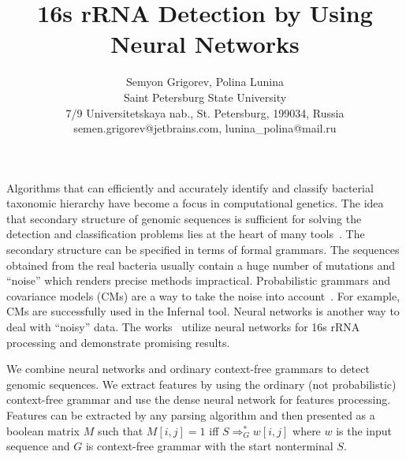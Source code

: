\documentclass[12pt]{article}  %
\title{16s rRNA Detection by Using Neural Networks}
\author{Semyon Grigorev, Polina Lunina
\\
       {Saint Petersburg State University}\\
       {7/9 Universitetskaya nab., St. Petersburg, 199034, Russia}\\
       semen.grigorev@jetbrains.com, lunina\_polina@mail.ru
       }
\date{}
\theoremstyle{definition}
\theoremstyle{remark}
\begin{document}
\maketitle
Algorithms that can efficiently and accurately identify and classify bacterial taxonomic hierarchy have become a focus in computational genetics.
The idea that secondary structure of genomic sequences is sufficient for solving the detection and classification problems lies at the heart of many tools~\cite{GrammarsRNA, PCFG, meta, LWPCFG}. 
The secondary structure can be specified in terms of formal grammars. 
The sequences obtained from the real bacteria usually contain a huge number of mutations and ``noise'' which renders precise methods impractical. 
Probabilistic grammars and covariance models (CMs) are a way to take the noise into account~\cite{EddyDurbin}.
For example, CMs are successfully used in the Infernal tool.%
Neural networks is another way to deal with ``noisy'' data. 
The works~\cite{Humidor, ANN} utilize neural networks for 16s rRNA processing and demonstrate promising results. 
%


We combine neural networks and ordinary context-free grammars to detect genomic sequences. 
We extract features by using the ordinary (not probabilistic) context-free grammar and use the dense neural network for features processing.
Features can be extracted by any parsing algorithm and then presented as a boolean matrix $M$ such that $M[i,j]=1$ iff $S \Rightarrow^*_G w[i,j]$ where $w$ is the input sequence and $G$ is context-free grammar with the start nonterminal $S$.

\end{document}

